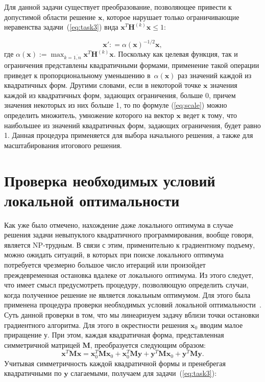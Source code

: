 Для данной задачи существует преобразование, позволяющее привести к допустимой области решение $\textbf{x}$, которое нарушает только ограничивающие неравенства задачи~(\ref{eq:task3}) вида $\textbf{x}^{T}\textbf{H}^{(k)}\textbf{x} \leq 1$:

\begin{equation}
    \textbf{x}': =\alpha(\textbf{x})^{-1/2} \textbf{x} ,
    \label{eq:scale}
\end{equation}
где $\alpha(\textbf{x}):=\max_{k=\overline{1,n}} \textbf{x}^T \textbf{H}^{(k)}\textbf{x}$. Поскольку как целевая функция, так и ограничения представлены квадратичными формами, применение такой операции приведет к пропорциональному уменьшению в~$\alpha(\textbf{x})$ раз значений каждой из квадратичных форм. Другими словами, если в некоторой точке $\textbf{x}$ значения каждой из квадратичных форм, задающих ограничения, больше 0, причем значения некоторых из них больше 1, то по формуле (\ref{eq:scale}) можно определить множитель, умножение которого на вектор $\textbf{x}$ ведет к тому, что наибольшее из значений квадратичных форм, задающих ограничения, будет равно 1. Данная процедура применяется для выбора начального решения, а также для масштабирования итогового решения.

\section{Проверка необходимых условий локальной оптимальности} \label{sec:loc}

Как уже было отмечено, нахождение даже локального оптимума в случае решения задачи невыпуклого квадратичного программирования, вообще говоря, является NP-трудным. В связи с этим, применительно к градиентному подъему, можно ожидать ситуаций, в которых при поиске локального оптимума потребуется чрезмерно большое число итераций или произойдет преждевременная остановка вдалеке от локального оптимума. Из этого следует, что имеет смысл предусмотреть процедуру, позволяющую определить случаи, когда полученное решение не является локальным оптимумом. Для этого была применена процедура проверки необходимых условий локальной оптимальности~\cite{murty:np}. Суть данной проверки в том, что мы линеаризуем задачу вблизи точки остановки градиентного алгоритма. Для этого в окрестности решения $\textbf{x}_0$ вводим малое приращение $\textbf{у}$. При этом, каждая квадратичная форма, представленная симметричной матрицей $\textbf{M}$, преобразуется следующим образом:
$$\textbf{x}^T\textbf{M}\textbf{x} = \textbf{x}_0^T\textbf{M}\textbf{x}_0 +
\textbf{x}_0^T\textbf{M}\textbf{y} + \textbf{y}^T\textbf{M}\textbf{x}_0 +
\textbf{y}^T\textbf{M}\textbf{y}.$$ Учитывая симметричность каждой квадратичной формы и пренебрегая квадратичными по $\textbf{y}$ слагаемыми, получаем для задачи~(\ref{eq:task3}):


